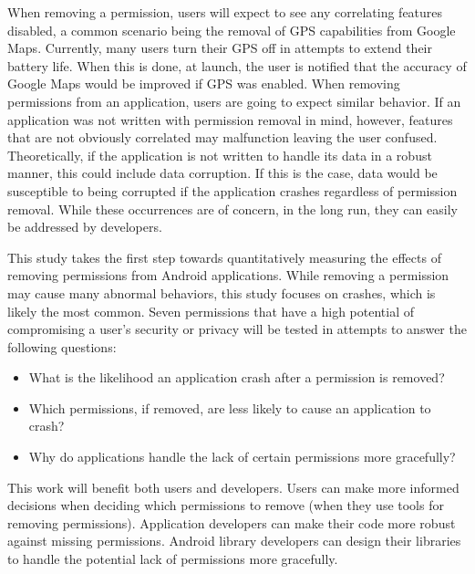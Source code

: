 When removing a permission, users will expect to see any correlating features disabled, a common scenario being the removal of GPS capabilities from Google Maps.  Currently, many users turn their GPS off in attempts to extend their battery life.  When this is done, at launch, the user is notified that the accuracy of Google Maps would be improved if GPS was enabled.  When removing permissions from an application, users are going to expect similar behavior.  If an application was not written with permission removal in mind, however, features that are not obviously correlated may malfunction leaving the user confused.  Theoretically, if the application is not written to handle its data in a robust manner, this could include data corruption.  If this is the case, data would be susceptible to being corrupted if the application crashes regardless of permission removal.  While these occurrences are of concern, in the long run, they can easily be addressed by developers.  

This study takes the first step towards quantitatively measuring the effects of removing permissions from Android applications.  While removing a permission may cause many abnormal behaviors, this study focuses on crashes, which is likely the most common.  Seven permissions that have a high potential of compromising a user's security or privacy will be tested in attempts to answer the following questions:

\begin{itemize}
\item What is the likelihood an application crash after a permission is removed?

\item Which permissions, if removed, are less likely to cause an application to crash?

\item Why do applications handle the lack of certain permissions more gracefully?

\end{itemize}

This work will benefit both users and developers.  Users can make more informed decisions when deciding which permissions to remove (when they use tools for removing permissions).  Application developers can make their code more robust against missing permissions.  Android library developers can design their libraries to handle the potential lack of permissions more gracefully.  
	
